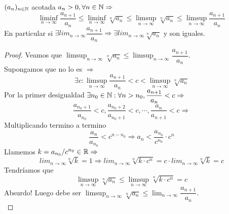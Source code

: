 \begin{theorem}
  $(a_n)_{n \in \mathbb{N}}$ acotada $a_n > 0, \forall n \in \mathbb{N} \Rightarrow$ \begin{equation}
    \liminf_{n \to \infty} \dfrac{a_{n+1}}{a_n} \leq \liminf_{n \to \infty} \sqrt[n]{a_n} \leq \limsup_{n \to \infty} \sqrt[n]{a_n} \leq \limsup_{n \to \infty} \dfrac{a_{n+1}}{a_n}
  \end{equation}
  En particular si $\exists lim_{n \to \infty} \dfrac{a_{n+1}}{a_n} \Rightarrow \exists lim_{n \to \infty} \sqrt[n]{a_n}$ y son iguales.

  \begin{proof}
    Veamos que $\limsup_{n \to \infty} \sqrt[n]{a_n} \leq \limsup_{n \to \infty} \dfrac{a_{n+1}}{a_n}$. \\
    Supongamos que no lo es $\Rightarrow$
    \begin{equation}
      \exists c : \limsup_{n \to \infty} \dfrac{a_{n+1}}{a_n} < c < \limsup_{n \to \infty} \sqrt[n]{a_n}
    \end{equation} Por la primer desigualdad $\exists n_0 \in \mathbb{N} : \forall n > n_0, \dfrac{a_{n+1}}{a_n} < c \Rightarrow$ \begin{equation}
      \dfrac{a_{n_0+1}}{a_{n_0}} < c, \dfrac{a_{n_0+2}}{a_{n_0+1}} < c, \cdots, \dfrac{a_n}{a_{n+1}} < c \Rightarrow
    \end{equation}
    Multiplicando termino a termino
    \begin{equation}
      \dfrac{a_n}{a_{n_0}} < c^{n - n_0} \Rightarrow a_n < \dfrac{a_{n_0}}{c^{n_0}} \cdot c^n
    \end{equation} Llamemos $k = a_{n_0}/c^{n_0} \in \mathbb{R} \Rightarrow$ \begin{equation} 
      lim_{n \to \infty} \sqrt[n]{k} = 1 \Rightarrow lim_{n \to \infty} \sqrt[n]{k \cdot c^n} = c \cdot lim_{n \to \infty} \sqrt[n]{k} = c
    \end{equation} Tendríamos que \begin{equation}
      \limsup_{n \to \infty} \sqrt[n]{a_n} \leq \limsup_{n \to \infty} \sqrt[n]{k \cdot c^n} = c
    \end{equation} Absurdo!
    Luego debe ser $\limsup_{n \to \infty} \sqrt[n]{a_n} \leq \lim_{n \to \infty} \dfrac{a_{n+1}}{a_n}$. \\
  \end{proof}
\end{theorem}

